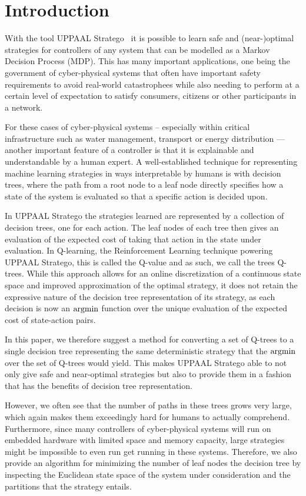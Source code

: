 \section{Introduction}%
\label{sec:intro}

With the tool UPPAAL Stratego~\cite{David2015UppaalS} it is possible to learn
safe and (near-)optimal strategies for controllers of any system that can be
modelled as a Markov Decision Process (MDP). This has many important
applications, one being the government of cyber-physical systems that often have
important safety requirements to avoid real-world catastrophees while also
needing to perform at a certain level of expectation to satisfy consumers,
citizens or other participants in a network.

For these cases of cyber-physical systems -- especially within critical
infrastructure such as water management, transport or energy distribution ---
another important feature of a controller is that it is explainable and
understandable by a human expert. A well-established technique for representing
machine learning strategies in ways interpretable by humans is with decision
trees, where the path from a root node to a leaf node directly specifies how a
state of the system is evaluated so that a specific action is decided upon.

In UPPAAL Stratego the strategies learned are represented by a collection of
decision trees, one for each action. The leaf nodes of each tree then gives an
evaluation of the expected cost of taking that action in the state under
evaluation. In Q-learning, the Reinforcement Learning technique powering UPPAAL
Stratego, this is called the Q-value and as such, we call the trees Q-trees.
While this approach allows for an online discretization of a continuous state
space and improved approximation of the optimal strategy, it does not retain the
expressive nature of the decision tree representation of its strategy, as each
decision is now an $\operatorname*{argmin}$ function over the unique evaluation of the expected
cost of state-action pairs.

In this paper, we therefore suggest a method for converting a set of Q-trees to
a single decision tree representing the same deterministic strategy that the
$\operatorname*{argmin}$ over the set of Q-trees would yield. This makes UPPAAL Stratego able
to not only give safe and near-optimal strategies but also to provide them in a
fashion that has the benefits of decision tree representation.

However, we often see that the number of paths in these trees grows very large,
which again makes them exceedingly hard for humans to actually comprehend.
Furthermore, since many controllers of cyber-physical systems will run on
embedded hardware with limited space and memory capacity, large strategies might
be impossible to even run get running in these systems. Therefore, we also
provide an algorithm for minimizing the number of leaf nodes the decision tree
by inspecting the Euclidean state space of the system under consideration and
the partitions that the strategy entails.
